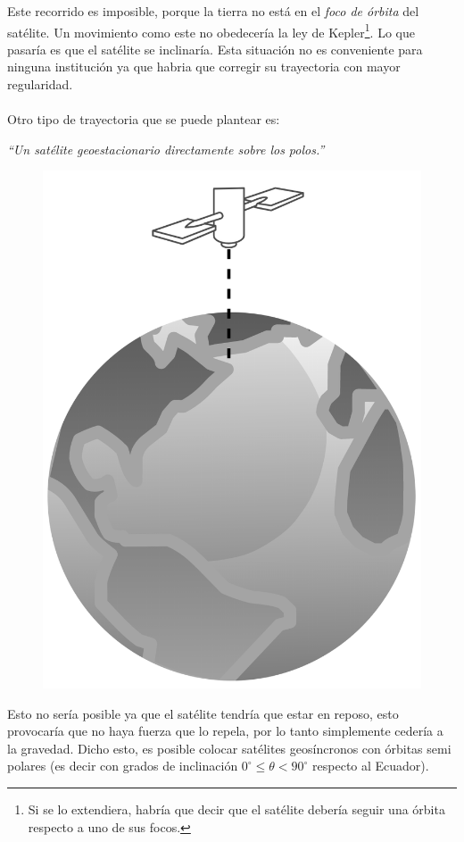 Este recorrido es imposible, porque la tierra no está en el \textit{foco de órbita} del satélite. Un movimiento como este no obedecería la ley de Kepler\footnote{Si se lo extendiera, habría que decir que el satélite debería seguir una órbita respecto a uno de sus focos.}. Lo que pasaría es que el satélite se inclinaría. Esta situación no es conveniente para ninguna institución ya que habria que corregir su trayectoria con mayor regularidad. \\{ }\\
Otro tipo de trayectoria que se puede plantear es: 
\begin{center}
 \textit{``Un satélite geoestacionario directamente sobre los polos.''}
\end{center}

\begin{figure}[ht!]
\centering
\includegraphics[scale=0.075]{imagenes/polo.png}
\end{figure}

Esto no sería posible ya que el satélite tendría que estar en reposo, esto provocaría que no haya fuerza que lo repela, por lo tanto simplemente cedería a la gravedad. Dicho esto, es posible colocar satélites geosíncronos con órbitas semi polares (es decir con grados de inclinación $0^\circ \leq \theta < 90^\circ$ respecto al Ecuador).
